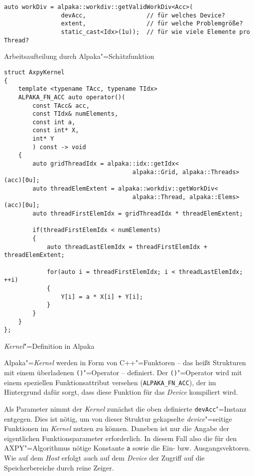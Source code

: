 \begin{code}
    \begin{verbatim}
auto workDiv = alpaka::workdiv::getValidWorkDiv<Acc>(
                devAcc,                 // für welches Device?
                extent,                 // für welche Problemgröße?
                static_cast<Idx>(1u));  // für wie viele Elemente pro Thread?
    \end{verbatim}
    \caption{Arbeitsaufteilung durch Alpaka"=Schätzfunktion}
    \label{alpaka:ueberblick:axpy:kernel:workdiv}
\end{code}

\begin{code}
    \begin{verbatim}
struct AxpyKernel
{
    template <typename TAcc, typename TIdx>
    ALPAKA_FN_ACC auto operator()(
        const TAcc& acc,
        const TIdx& numElements,
        const int a,
        const int* X,
        int* Y
        ) const -> void
    {
        auto gridThreadIdx = alpaka::idx::getIdx<
                                    alpaka::Grid, alpaka::Threads>(acc)[0u];
        auto threadElemExtent = alpaka::workdiv::getWorkDiv<
                                    alpaka::Thread, alpaka::Elems>(acc)[0u];
        auto threadFirstElemIdx = gridThreadIdx * threadElemExtent;

        if(threadFirstElemIdx < numElements)
        {
            auto threadLastElemIdx = threadFirstElemIdx + threadElemExtent;
            
            for(auto i = threadFirstElemIdx; i < threadLastElemIdx; ++i)
            {
                Y[i] = a * X[i] + Y[i];
            }
        }
    }
};
    \end{verbatim}
    \caption{\textit{Kernel}"=Definition in Alpaka}
    \label{alpaka:ueberblick:axpy:kernel:kernel_src}
\end{code}
\vspace{3mm}
Alpaka"=\textit{Kernel} werden in Form von C++"=Funktoren -- das heißt Strukturen mit
einem überladenen \texttt{()}"=Operator -- definiert. Der \texttt{()}"=Operator
wird mit einem speziellen Funktionsattribut versehen (\texttt{ALPAKA\_FN\_ACC}),
der im Hintergrund dafür sorgt, dass diese Funktion für das \textit{Device}
kompiliert wird.

Als Parameter nimmt der \textit{Kernel} zunächst die oben definierte
\texttt{devAcc}"=Instanz entgegen. Dies ist nötig, um von dieser Struktur
gekapselte \textit{device}"=seitige Funktionen im \textit{Kernel} nutzen zu
können. Daneben ist nur die Angabe der eigentlichen Funktionsparameter
erforderlich. In diesem Fall also die für den AXPY"=Algorithmus nötige Konstante
\texttt{a} sowie die Ein- bzw. Ausgangsvektoren. Wie auf dem \textit{Host}
erfolgt auch auf dem \textit{Device} der Zugriff auf die Speicherbereiche durch
reine Zeiger.

